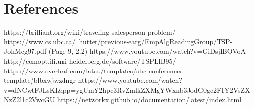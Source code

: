 \documentclass[12pt]{article}
\begin{document}
\section{References}

https://brilliant.org/wiki/traveling-salesperson-problem/
https://www.cs.ubc.ca/~hutter/previous-earg/EmpAlgReadingGroup/TSP-JohMcg97.pdf (Page 9, 2.2)
https://www.youtube.com/watch?v=GiDsjIBOVoA
http://comopt.ifi.uni-heidelberg.de/software/TSPLIB95/
https://www.overleaf.com/latex/templates/sbc-conferences-template/blbxwjwzdngr
https://www.youtube.com/watch?v=dNCwtFJLsKI&pp=ygUmY2hpc3RvZmlkZXMgYWxnb3JodG0gc2F1Y2VsZXNzZ2l1c2VwcGU%
https://networkx.github.io/documentation/latest/index.html



\end{document}
